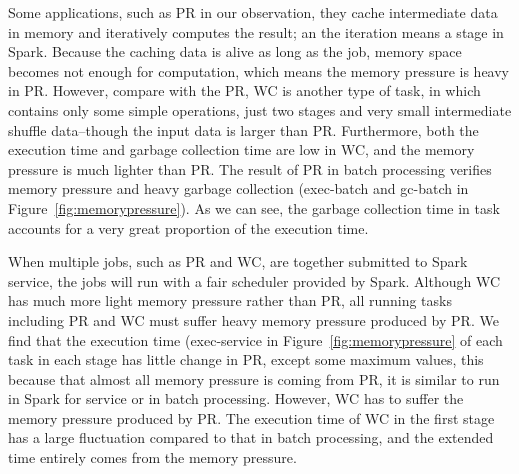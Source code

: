 \begin{comment}
\begin{figure}[!t]
\centering
\subfigure[Execution Time]{
\label{fig:subfig:mot-exec}
\texttt{[image: motivation-exec.pdf]}}
\hspace{-1.3ex}
\subfigure[GC Time]{
\label{fig:subfig:mot-gc}
\texttt{[image: motivation-gc.pdf]}}
\label{fig:wc-result}
\vspace{-2mm}
\caption{The Impact of Memory Pressure}
\vspace{-2mm}
\end{figure}
\end{comment}

Some applications, such as PR in our observation, they cache intermediate data in memory and iteratively computes the result; an the iteration means a stage in Spark. Because the caching data is alive as long as the job, memory space becomes not enough for computation, which means the memory pressure is heavy in PR. However, compare with the PR, WC is another type of task, in which contains only some simple operations, just two stages and very small intermediate shuffle data--though the input data is larger than PR. Furthermore, both the execution time and garbage collection time are low in WC, and the memory pressure is much lighter than PR. The result of PR in batch processing verifies memory pressure and heavy garbage collection (exec-batch and gc-batch in Figure~\ref{fig:memorypressure}). As we can see, the garbage collection time in task accounts for a very great proportion of the execution time.


When multiple jobs, such as PR and WC, are together submitted to Spark service, the jobs will run with a fair scheduler provided by Spark. Although WC has much more light memory pressure rather than PR, all running tasks including PR and WC must suffer heavy memory pressure produced by PR. We find that the execution time (exec-service in Figure~\ref{fig:memorypressure} of each task in each stage has little change in PR, except some maximum values, this because that almost all memory pressure is coming from PR, it is similar to run in Spark for service or in batch processing. However, WC has to suffer the memory pressure produced by PR. The execution time of WC in the first stage has a large fluctuation compared to that in batch processing, and the extended time entirely comes from the memory pressure.

